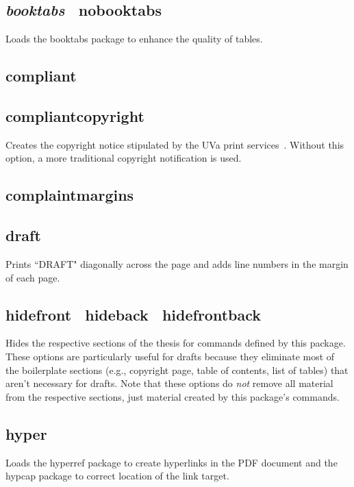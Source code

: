 \documentclass[10pt]{article}
\newcommand{\package}[1]{#1}
\newcommand{\option}[1]{#1}
\newcommand{\default}[1]{\emph{#1}}
\begin{document}
\subsection{\default{\option{booktabs}} \textbar\ \option{nobooktabs}}
Loads the \package{booktabs} package to enhance the quality of tables.

\subsection{\option{compliant}}


\subsection{\option{compliantcopyright}}
Creates the copyright notice stipulated by the \gls{UVa} print services~\cite{uvaprint:thesis}.
Without this option, a more traditional copyright notification is used.

\subsection{\option{complaintmargins}}


\subsection{\option{draft}}
Prints ``DRAFT" diagonally across the page and adds line numbers in the margin of each page.

\subsection{\option{hidefront} \textbar\ \option{hideback} \textbar\ \option{hidefrontback}}
Hides the respective sections of the thesis for commands defined by this package.
These options are particularly useful for drafts because they eliminate most of the boilerplate sections (e.g., copyright page, table of contents, list of tables) that aren't necessary for drafts.
Note that these options do \emph{not} remove all material from the respective sections, just material created by this package's commands.

\subsection{\option{hyper}}
Loads the \package{hyperref} package to create hyperlinks in the PDF document and the \package{hypcap} package to correct location of the link target.
\end{document}
